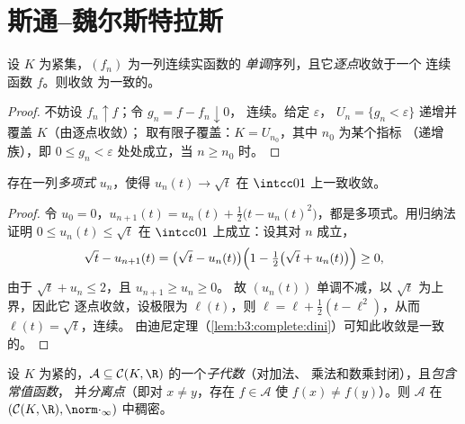 \section{斯通–魏尔斯特拉斯}

\begin{lemma}[迪尼]\label{lem:b3:complete:dini}
设 $K$ 为紧集，$(f_n)$ 为一列连续实函数的
\emph{单调}序列，且它\emph{逐点}收敛于一个
连续函数 $f$。则收敛
为一致的。
\end{lemma}

\begin{proof}
不妨设 $f_n \uparrow f$；令 $g_n = f - f_n \downarrow 0$，
连续。给定 $\varepsilon$， $U_n = \{g_n <
\varepsilon\}$ 递增并覆盖 $K$（由逐点收敛）；
取有限子覆盖：$K = U_{n_0}$，其中 $n_0$ 为某个指标
（递增族），即 $0 \leq g_n < \varepsilon$
处处成立，当 $n \geq n_0$ 时。
\end{proof}

\begin{lemma}\label{lem:b3:complete:sqrt}
存在一列\emph{多项式} $u_n$，使得 $u_n(t) \to
\sqrt t$ 在 $\intcc01$ 上一致收敛。
\end{lemma}

\begin{proof}
令 $u_0 = 0$，$u_{n+1}(t) = u_n(t) + \frac12\bigl(t -
u_n(t)^2\bigr)$，都是多项式。用归纳法证明 $0 \leq u_n(t) \leq
\sqrt t$ 在 $\intcc01$ 上成立：设其对 $n$ 成立，
\[
\sqrt t - u_{n+1}(t) = \bigl(\sqrt t - u_n(t)\bigr)
\Bigl(1 - \tfrac12\bigl(\sqrt t + u_n(t)\bigr)\Bigr) \geq 0,
\]
由于 $\sqrt t + u_n \leq 2$，且 $u_{n+1} \geq u_n \geq 0$。
故 $(u_n(t))$ 单调不减，以 $\sqrt t$ 为上界，因此它
逐点收敛，设极限为 $\ell(t)$，则 $\ell =
\ell + \frac12(t - \ell^2)$，从而 $\ell(t) = \sqrt t$，连续。
由迪尼定理（\cref{lem:b3:complete:dini}）可知此收敛是一致的。
\end{proof}

\begin{theorem}
\label{thm:b3:complete:stoneweierstrass}
设 $K$ 为紧的，$\mathcal A \subseteq
\mathcal C(K, \R)$ 的一个\emph{子代数}（对加法、
乘法和数乘封闭），且\emph{包含常值函数}，
并\emph{分离点}（即对 $x \neq y$，存在 $f \in
\mathcal A$ 使 $f(x) \neq f(y)$）。则 $\mathcal A$ 在
$(\mathcal C(K,\R), \norm\cdot_\infty)$ 中稠密。
\end{theorem}

